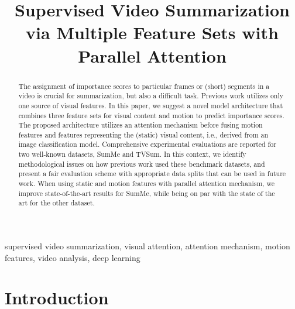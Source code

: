 \documentclass{article}
\begin{document}
\sloppy

					  
					  
				   
				

\title{Supervised Video Summarization via Multiple Feature Sets with Parallel Attention}

		
		
																						
																											
 
\address{ TIB -- Leibniz Information Centre for Science and Technology, Hannover, Germany
\\
 L3S Research Center, Leibniz University Hannover, Germany\\
\{junaid.ghauri, sherzod.hakimov, ralph.ewerth\}@tib.eu}

\maketitle


\begin{abstract}
The assignment of importance scores to particular frames or (short) segments in a video is crucial for summarization, but also a difficult task. Previous work utilizes only one source of visual features. 
In this paper, we suggest a novel model architecture that combines three feature sets for visual content and motion to predict importance scores.
The proposed architecture utilizes an attention mechanism before fusing motion features and features representing the (static) visual content, i.e., derived from an image classification model.
Comprehensive experimental evaluations are reported for two well-known datasets, SumMe and TVSum. 
In this context, we identify methodological issues on how previous work used these benchmark datasets, and present a fair evaluation scheme with appropriate data splits that can be used in future work. 
When using static and motion features with parallel attention mechanism, we improve state-of-the-art results for SumMe, while being on par with the state of the art for the other dataset.

\end{abstract}
\begin{keywords}
supervised video summarization, visual attention, attention mechanism, motion features, video analysis, deep learning
\end{keywords}
\section{Introduction}
\label{sec:intro}
\end{document}
